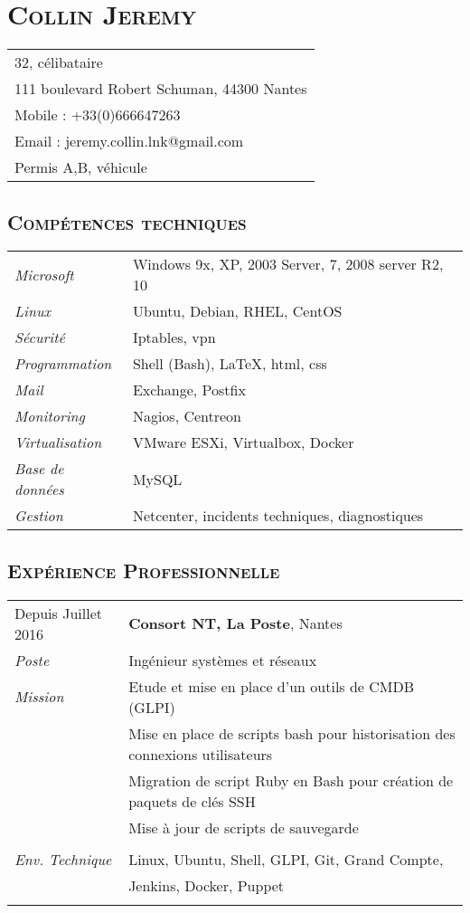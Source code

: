 \documentclass[a4paper]{article}
\newcommand{\hsection}[1]{\section*{\fontfamily{phv}\selectfont\textsc{#1}}}
\newcommand{\hsubsection}[1]{\subsection*{\fontfamily{phv}\selectfont\textsc{#1}}}
\begin{document}
\selectfont
\hsection{Collin Jeremy}
\begin{tabular}{p{16.5cm}}
\hline
32, célibataire\\
111 boulevard Robert Schuman, 44300 Nantes\\
Mobile : +33(0)666647263\\
Email : jeremy.collin.lnk@gmail.com\\
Permis A,B, véhicule\\
\end{tabular}

\hsubsection{Compétences techniques}
\begin{tabular}{P{3.5cm}|p{13cm}}
\textsl{Microsoft}		& Windows 9x, XP, 2003 Server, 7, 2008 server R2, 10\\
\textsl{Linux}			& Ubuntu, Debian, RHEL, CentOS\\
\textsl{Sécurité}		& Iptables, vpn\\
\textsl{Programmation}		& Shell (Bash), \LaTeX, html, css\\
\textsl{Mail}			& Exchange, Postfix\\
\textsl{Monitoring}		& Nagios, Centreon\\
\textsl{Virtualisation}		& VMware ESXi, Virtualbox, Docker\\
\textsl{Base de données}	& MySQL\\
\textsl{Gestion}		& Netcenter, incidents techniques, diagnostiques\\
\end{tabular}

\hsubsection{Expérience Professionnelle}
\begin{tabular}{P{3.5cm}|p{13cm}}
Depuis Juillet 2016		& \textbf{Consort NT, La Poste}, Nantes\\
\textsl{Poste}			& Ingénieur systèmes et réseaux\\
\textsl{Mission}		& Etude et mise en place d'un outils de CMDB (GLPI)\\
				& Mise en place de scripts bash pour historisation des connexions utilisateurs\\
				& Migration de script Ruby en Bash pour création de paquets de clés SSH\\
				& Mise à jour de scripts de sauvegarde\\
				& \\
\textsl{Env. Technique}		& Linux, Ubuntu, Shell, GLPI, Git, Grand Compte,\\
				& Jenkins, Docker, Puppet \\
 & \\
\end{tabular}
\end{document}

